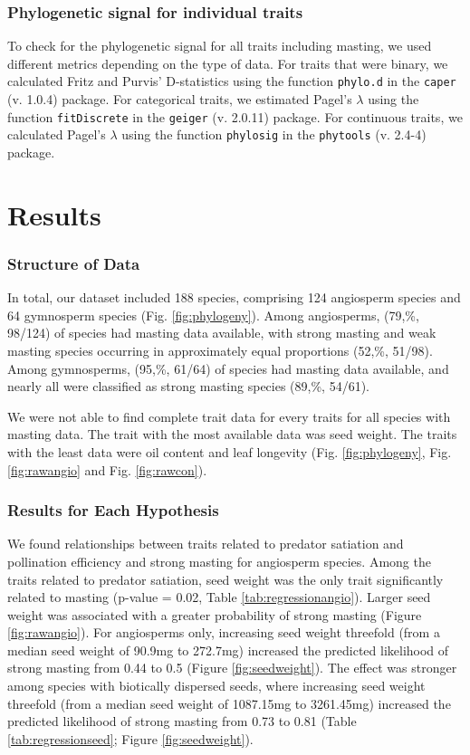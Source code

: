 \documentclass{article}
\begin{document}
\subsubsection{Phylogenetic signal for individual traits}
To check for the phylogenetic signal for all traits including masting, we used different metrics depending on the type of data. For traits that were binary, we calculated Fritz and Purvis' D-statistics using the function \texttt{phylo.d} in the \texttt{caper}  (v. 1.0.4) package. For categorical traits, we estimated Pagel's $\lambda$ using the function \texttt{fitDiscrete} in the \texttt{geiger} (v. 2.0.11) package. For continuous traits, we calculated Pagel's $\lambda$ using the function \texttt{phylosig} in the \texttt{phytools} (v. 2.4-4) package. 

\section{Results}
\subsubsection{Structure of Data}
In total, our dataset included 188 species, comprising 124 angiosperm species and 64 gymnosperm species (Fig. \ref{fig:phylogeny}). Among angiosperms, (79,\%, 98/124) of species had masting data available, with strong masting and weak masting species occurring in approximately equal proportions (52,\%, 51/98). Among gymnosperms, (95,\%, 61/64) of species had masting data available, and nearly all were classified as strong masting species (89,\%, 54/61).

We were not able to find complete trait data for every traits for all species with masting data. The trait with the most available data was seed weight. The traits with the least data were oil content and leaf longevity (Fig. \ref{fig:phylogeny}, Fig. \ref{fig:rawangio} and Fig. \ref{fig:rawcon}).
\subsubsection{Results for Each Hypothesis}
We found relationships between traits related to predator satiation and pollination efficiency and strong masting for angiosperm species. Among the traits related to predator satiation, seed weight was the only trait significantly related to masting (p-value = 0.02, Table \ref{tab:regressionangio}). Larger seed weight was associated with a greater probability of strong masting (Figure \ref{fig:rawangio}). For angiosperms only, increasing seed weight threefold (from a median seed weight of 90.9mg to 272.7mg) increased the predicted likelihood of strong masting from 0.44 to 0.5 (Figure \ref{fig:seedweight}). The effect was stronger among species with biotically dispersed seeds, where increasing seed weight threefold (from a median seed weight of 1087.15mg to 3261.45mg) increased the predicted likelihood of strong masting from 0.73 to 0.81 (Table \ref{tab:regressionseed}; Figure \ref{fig:seedweight}). 
\end{document}
